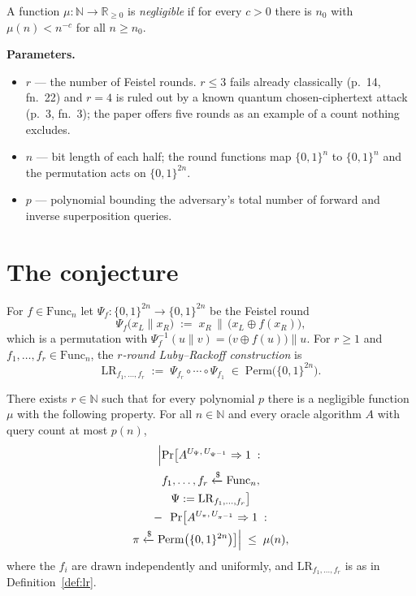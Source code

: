 \documentclass{aicr-conjecture}
\newcommand{\bits}{\{0,1\}}
\newcommand{\NN}{\mathbb{N}}
\newcommand{\RR}{\mathbb{R}}
\newcommand{\Func}{\mathrm{Func}}
\newcommand{\Perm}{\mathrm{Perm}}
\newcommand{\LR}{\mathrm{LR}}
\newcommand{\rsample}{\xleftarrow{\$}}
\begin{document}
A function $\mu : \NN \to \RR_{\ge 0}$ is \emph{negligible} if for
every $c > 0$ there is $n_0$ with $\mu(n) < n^{-c}$ for all
$n \ge n_0$.

\textbf{Parameters.}
\begin{itemize}[leftmargin=1.2em]
\item $r$ --- the number of Feistel rounds. $r \le 3$ fails already
  classically (p.~14, fn.~22) and $r = 4$ is ruled out by a known
  quantum chosen-ciphertext attack (p.~3, fn.~3); the paper offers
  five rounds as an example of a count nothing excludes.
\item $n$ --- bit length of each half; the round functions map
  $\bits^n$ to $\bits^n$ and the permutation acts on $\bits^{2n}$.
\item $p$ --- polynomial bounding the adversary's total number of
  forward and inverse superposition queries.
\end{itemize}

\section{The conjecture}\label{sec:conjectures}

\begin{definition}\label{def:lr}
For $f \in \Func_n$ let $\Psi_f : \bits^{2n} \to \bits^{2n}$ be the
Feistel round
\[
  \Psi_f\bigl(x_L \| x_R\bigr) \;:=\;
  x_R \,\|\, \bigl(x_L \oplus f(x_R)\bigr),
\]
which is a permutation with
$\Psi_f^{-1}(u \| v) = \bigl(v \oplus f(u)\bigr) \| u$. For $r \ge 1$
and $f_1, \dots, f_r \in \Func_n$, the \emph{$r$-round Luby--Rackoff
construction} is
\[
  \LR_{f_1,\dots,f_r} \;:=\; \Psi_{f_r} \circ \cdots \circ \Psi_{f_1}
  \;\in\; \Perm\bigl(\bits^{2n}\bigr).
\]
\end{definition}

\begin{conjecture}\label{conj:main}
There exists $r \in \NN$ such that for every polynomial $p$ there is a
negligible function $\mu$ with the following property. For all
$n \in \NN$ and every oracle algorithm $A$ with query count at most
$p(n)$,
\begin{multline*}
  \Bigl| \Pr\bigl[ A^{U_\Psi,\, U_{\Psi^{-1}}} \Rightarrow 1 \;:\; \\
    f_1, \dots, f_r \rsample \Func_n, \\
    \Psi := \LR_{f_1,\dots,f_r} \bigr] \\
  {}-{}\; \Pr\bigl[ A^{U_\pi,\, U_{\pi^{-1}}} \Rightarrow 1 \;:\; \\
    \pi \rsample \Perm\bigl(\bits^{2n}\bigr) \bigr] \Bigr|
    \;\le\; \mu(n),
\end{multline*}
where the $f_i$ are drawn independently and uniformly, and
$\LR_{f_1,\dots,f_r}$ is as in Definition~\ref{def:lr}.
\end{conjecture}
\end{document}
